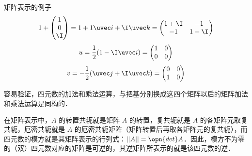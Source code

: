 \begin{example}{矩阵表示的例子}\label{Quat_ex1}
\begin{equation}
1+\begin{pmatrix}1\\0\\\I\end{pmatrix} =1+1\uvec i+\I\uvec k =\begin{pmatrix}1+\I&-1\\-1&1-\I\end{pmatrix} 
\end{equation}
\begin{equation}
u=\frac{1}{2}(1-\I\uvec i)=\begin{pmatrix}1&0\\0&0\end{pmatrix} 
\end{equation}
\begin{equation}
v=-\frac{1}{2}(\uvec j+\I\uvec k)=\begin{pmatrix}0&0\\1&0\end{pmatrix} 
\end{equation}
\end{example}

容易验证，四元数的加法和乘法运算，与把基分别换成这四个矩阵以后的矩阵加法和乘法运算是同构的．

在矩阵表示中，$A$ 的转置共轭就是矩阵 $A$ 的转置，复共轭就是 $A$ 的各矩阵元取复共轭，厄密共轭就是 $A$ 的厄密共轭矩阵（矩阵转置后再取各矩阵元的复共轭），而四元数的模方就是其矩阵表示的行列式：$||A||=\opn{det}A$．因此，模方不为零的（双）四元数对应的矩阵是可逆的，其逆矩阵所表示的就是该四元数的逆．
